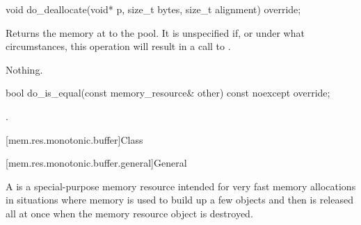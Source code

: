 %
%
\begin{itemdecl}
void do_deallocate(void* p, size_t bytes, size_t alignment) override;
\end{itemdecl}

\begin{itemdescr}
\pnum
\effects
Returns the memory at  to the pool.
It is unspecified if, or under what circumstances,
this operation will result in a call to .

\pnum
\throws
Nothing.
\end{itemdescr}

%
%
\begin{itemdecl}
bool do_is_equal(const memory_resource& other) const noexcept override;
\end{itemdecl}

\begin{itemdescr}
\pnum
\returns
{}.
\end{itemdescr}

[mem.res.monotonic.buffer]{Class }

[mem.res.monotonic.buffer.general]{General}

\pnum
A  is a special-purpose memory resource
intended for very fast memory allocations in situations
where memory is used to build up a few objects
and then is released all at once when the memory resource object is destroyed.

